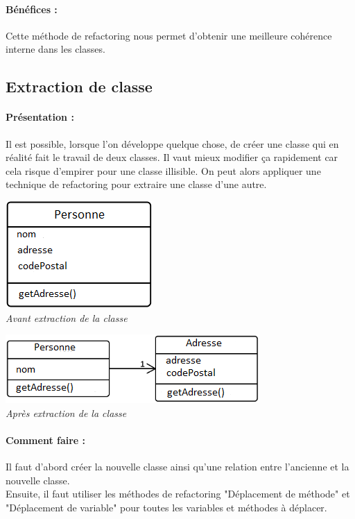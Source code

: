 \documentclass[a4paper,twoside,12pt,openright]{report}
\begin{document}
\paragraph{Bénéfices :}
Cette méthode de refactoring nous permet d'obtenir une meilleure cohérence interne dans les classes.\\

\subsection{Extraction de classe}
\paragraph{Présentation :}
Il est possible, lorsque l'on développe quelque chose, de créer une classe qui en réalité fait le travail de deux classes. Il vaut mieux modifier ça rapidement car cela risque d'empirer pour une classe illisible. On peut alors appliquer une technique de refactoring pour extraire une classe d'une autre.

\begin{center}
\includegraphics[scale=1]{Image/Extraction_Classe.png}\\
\itshape{Avant extraction de la classe}
\end{center}

\begin{center}
\includegraphics[scale=1]{Image/Extraction_Classe2.png}\\
\itshape{Après extraction de la classe}
\end{center}

\paragraph{Comment faire :}
Il faut d'abord créer la nouvelle classe ainsi qu'une relation entre l'ancienne et la nouvelle classe.\\
Ensuite, il faut utiliser les méthodes de refactoring "Déplacement de méthode" et "Déplacement de variable" pour toutes les variables et méthodes à déplacer.
\end{document}
